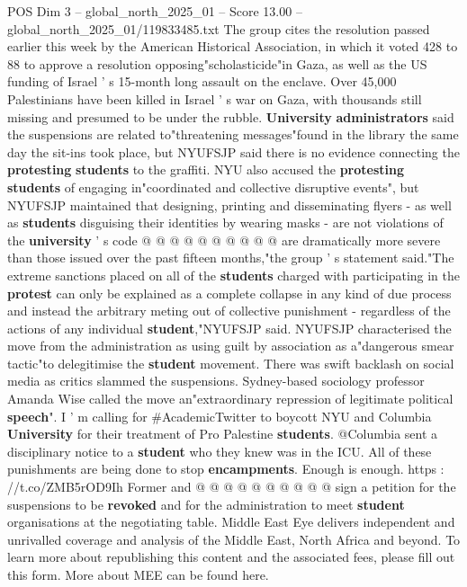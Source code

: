 \begin{textsample}{POS Dim 3 – global\_north\_2025\_01 – Score 13.00 – global\_north\_2025\_01/119833485.txt}
The group cites the resolution passed earlier this week by the American Historical Association, in which it voted 428 to 88 to approve a resolution opposing"scholasticide"in Gaza, as well as the US funding of Israel ' s 15-month long assault on the enclave.
Over 45,000 Palestinians have been killed in Israel ' s war on Gaza, with thousands still missing and presumed to be under the rubble. \textbf{University} \textbf{administrators} said the suspensions are related to"threatening messages"found in the library the same day the sit-ins took place, but NYUFSJP said there is no evidence connecting the \textbf{protesting} \textbf{students} to the graffiti.
NYU also accused the \textbf{protesting} \textbf{students} of engaging in"coordinated and collective disruptive events", but NYUFSJP maintained that designing, printing and disseminating flyers - as well as \textbf{students} disguising their identities by wearing masks - are not violations of the \textbf{university} ' s code @ @ @ @ @ @ @ @ @ @ are dramatically more severe than those issued over the past fifteen months,"the group ' s statement said."The extreme sanctions placed on all of the \textbf{students} charged with participating in the \textbf{protest} can only be explained as a complete collapse in any kind of due process and instead the arbitrary meting out of collective punishment - regardless of the actions of any individual \textbf{student},"NYUFSJP said.
NYUFSJP characterised the move from the administration as using guilt by association as a"dangerous smear tactic"to delegitimise the \textbf{student} movement.
There was swift backlash on social media as critics slammed the suspensions.
Sydney-based sociology professor Amanda Wise called the move an"extraordinary repression of legitimate political \textbf{speech}".
I ' m calling for \#AcademicTwitter to boycott NYU and Columbia \textbf{University} for their treatment of Pro Palestine \textbf{students}. @Columbia sent a disciplinary notice to a \textbf{student} who they knew was in the ICU.
All of these punishments are being done to stop \textbf{encampments}.
Enough is enough. https : //t.co/ZMB5rOD9Ih Former and @ @ @ @ @ @ @ @ @ @ sign a petition for the suspensions to be \textbf{revoked} and for the administration to meet \textbf{student} organisations at the negotiating table.
Middle East Eye delivers independent and unrivalled coverage and analysis of the Middle East, North Africa and beyond.
To learn more about republishing this content and the associated fees, please fill out this form.
More about MEE can be found here.

\end{textsample}
